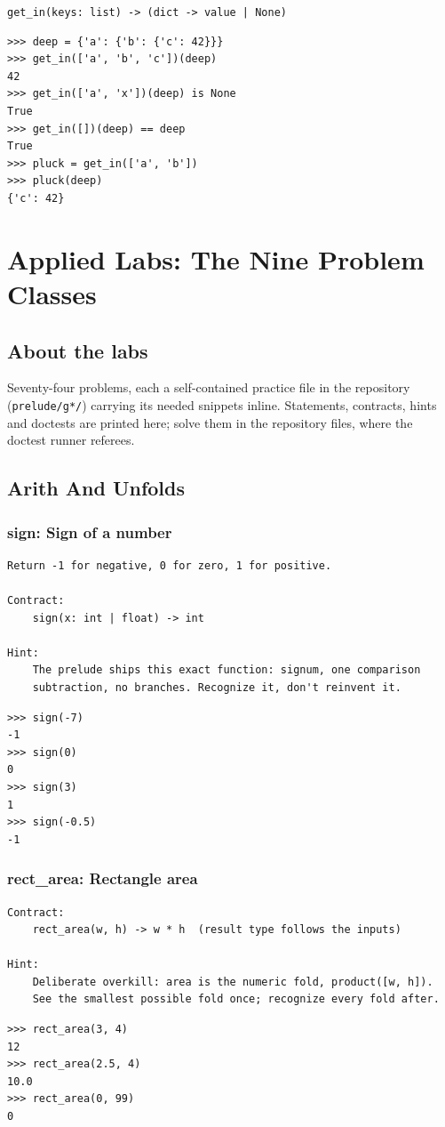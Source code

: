 \documentclass[10pt,letterpaper]{book}
\begin{document}
\noindent\texttt{get\_in(keys: list) -> (dict -> value | None)}
\begin{lstlisting}[style=ex]
>>> deep = {'a': {'b': {'c': 42}}}
>>> get_in(['a', 'b', 'c'])(deep)
42
>>> get_in(['a', 'x'])(deep) is None
True
>>> get_in([])(deep) == deep
True
>>> pluck = get_in(['a', 'b'])
>>> pluck(deep)
{'c': 42}
\end{lstlisting}
\clearpage
\part{Applied Labs: The Nine Problem Classes}
\chapter*{About the labs}
Seventy-four problems, each a self-contained practice file in the repository
(\texttt{prelude/g*/}) carrying its needed snippets inline. Statements,
contracts, hints and doctests are printed here; solve them in the repository files, where the doctest runner referees.
\chapter{Arith And Unfolds}

\section{sign: Sign of a number}
\begin{lstlisting}[style=ex]
Return -1 for negative, 0 for zero, 1 for positive.

Contract:
    sign(x: int | float) -> int

Hint:
    The prelude ships this exact function: signum, one comparison
    subtraction, no branches. Recognize it, don't reinvent it.
\end{lstlisting}
\begin{lstlisting}[style=ex]
>>> sign(-7)
-1
>>> sign(0)
0
>>> sign(3)
1
>>> sign(-0.5)
-1
\end{lstlisting}

\section{rect\_area: Rectangle area}
\begin{lstlisting}[style=ex]
Contract:
    rect_area(w, h) -> w * h  (result type follows the inputs)

Hint:
    Deliberate overkill: area is the numeric fold, product([w, h]).
    See the smallest possible fold once; recognize every fold after.
\end{lstlisting}
\begin{lstlisting}[style=ex]
>>> rect_area(3, 4)
12
>>> rect_area(2.5, 4)
10.0
>>> rect_area(0, 99)
0
\end{lstlisting}
\end{document}
